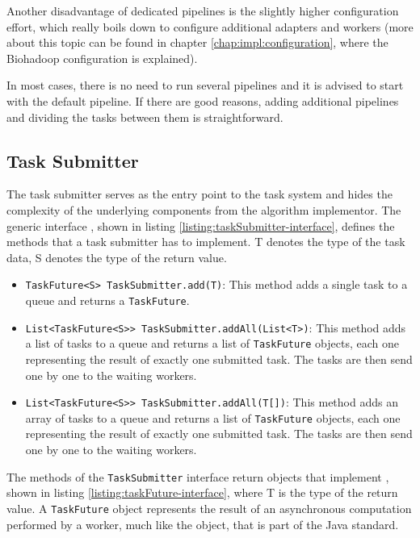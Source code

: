   Another disadvantage of dedicated pipelines is the slightly higher configuration effort, which really boils down to configure additional adapters and workers (more about this topic can be found in chapter \ref{chap:impl:configuration}, where the Biohadoop configuration is explained).
  
  In most cases, there is no need to run several pipelines and it is advised to start with the default pipeline. If there are good reasons, adding additional pipelines and dividing the tasks between them is straightforward.
  
  \subsection{Task Submitter}
  \label{chap:impl:task-submitter}
  The task submitter serves as the entry point to the task system and hides the complexity of the underlying components from the algorithm implementor. The generic interface , shown in listing \ref{listing:taskSubmitter-interface}, defines the methods that a task submitter has to implement. T denotes the type of the task data, S denotes the type of the return value.

  

  \begin{itemize}
    \item \texttt{TaskFuture<S> TaskSubmitter.add(T)}: This method adds a single task to a queue and returns a \texttt{TaskFuture}.
    \item \texttt{List<TaskFuture<S>> TaskSubmitter.addAll(List<T>)}: This method adds a list of tasks to a queue and returns a list of \texttt{TaskFuture} objects, each one representing the result of exactly one submitted task. The tasks are then send one by one to the waiting workers.
    \item \texttt{List<TaskFuture<S>> TaskSubmitter.addAll(T[])}: This method adds an array of tasks to a queue and returns a list of \texttt{TaskFuture} objects, each one representing the result of exactly one submitted task. The tasks are then send one by one to the waiting workers.
  \end{itemize}
  
  \noindent
  The methods of the \texttt{TaskSubmitter} interface return objects that implement , shown in listing \ref{listing:taskFuture-interface}, where T is the type of the return value. A \texttt{TaskFuture} object represents the result of an asynchronous computation performed by a worker, much like the  object, that is part of the Java standard.

